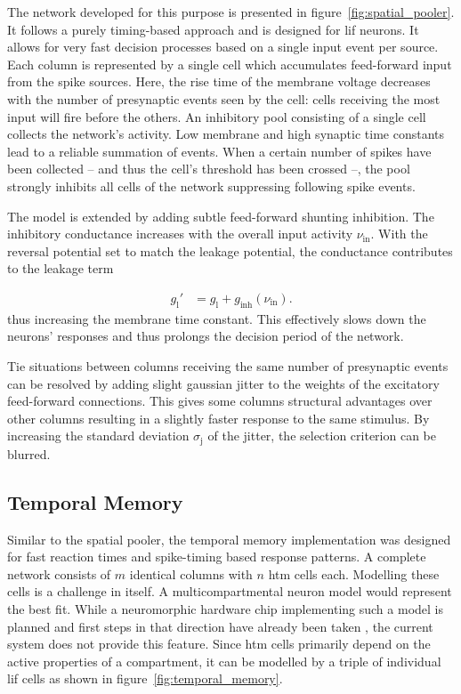 The network developed for this purpose is presented in figure~\ref{fig:spatial_pooler}. It follows a purely timing-based approach and is designed for \gls{lif} neurons. It allows for very fast decision processes based on a single input event per source. Each column is represented by a single cell which accumulates feed-forward input from the spike sources. Here, the rise time of the membrane voltage decreases with the number of presynaptic events seen by the cell: cells receiving the most input will fire before the others. An inhibitory pool consisting of a single cell collects the network's activity. Low membrane and high synaptic time constants lead to a reliable summation of events. When a certain number of spikes have been collected -- and thus the cell's threshold has been crossed --, the pool strongly inhibits all cells of the network suppressing following spike events.

The model is extended by adding subtle feed-forward shunting inhibition. The inhibitory conductance increases with the overall input activity $\nu_\text{in}$. With the reversal potential set to match the leakage potential, the conductance contributes to the leakage term

\begin{align*}
	g_\text{l}' &= g_\text{l} + g_\text{inh}(\nu_\text{in}).
\end{align*}
%
thus increasing the membrane time constant. This effectively slows down the neurons' responses and thus prolongs the decision period of the network.

Tie situations between columns receiving the same number of presynaptic events can be resolved by adding slight gaussian jitter to the weights of the excitatory feed-forward connections. This gives some columns structural advantages over other columns resulting in a slightly faster response to the same stimulus. By increasing the standard deviation $\sigma_\text{j}$ of the jitter, the selection criterion can be blurred.


\subsection{Temporal Memory}

Similar to the spatial pooler, the temporal memory implementation was designed for fast reaction times and spike-timing based response patterns. A complete network consists of $m$ identical columns with $n$ \gls{htm} cells each. Modelling these cells is a challenge in itself. A multicompartmental neuron model would represent the best fit. While a neuromorphic hardware chip implementing such a model is planned and first steps in that direction have already been taken \citep{millner2012development}, the current system does not provide this feature. Since \gls{htm} cells primarily depend on the active properties of a compartment, it can be modelled by a triple of individual \gls{lif} cells as shown in figure~\ref{fig:temporal_memory}.

